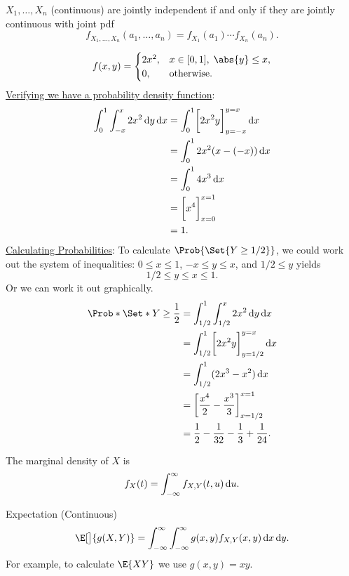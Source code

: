 \begin{Theorem}{}{}
    $ X_1,\ldots,X_n $ (continuous) are jointly independent
    if and only if they are jointly continuous with joint pdf
    \[ f_{X_1,\ldots,X_n}(a_1,\ldots,a_n)=f_{X_1}(a_1)\cdots f_{X_n}(a_n). \]
\end{Theorem}
\begin{Example}{}{}
    \[ f(x,y)=\begin{cases}
            2x^2, & x\in[0,1],\; \abs{y}\le x, \\
            0,    & \text{otherwise}.
        \end{cases} \]
    \underline{Verifying we have a probability density function}:
    \begin{align*}
        \int_{0}^{1}\int_{-x}^{x}2x^2\odif{y}\odif{x}
         & =\int_{0}^{1}\biggl[2x^2y\biggr]_{y=-x}^{y=x}\odif{x} \\
         & =\int_{0}^{1}2x^2(x-(-x))\odif{x}                     \\
         & =\int_{0}^{1}4x^3\odif{x}                             \\
         & =\biggl[x^4\biggr]_{x=0}^{x=1}                        \\
         & =1.
    \end{align*}
    \underline{Calculating Probabilities}:
    To calculate $ \Prob{\Set{Y\ge 1/2}} $,
    we could work out
    the system of inequalities: $ 0\le x\le 1 $, $ -x\le y\le x $, and $ 1/2\le y $ yields
    \[ 1/2\le y\le x\le 1. \]
    Or we can work it out graphically.
    \begin{align*}
        \Prob*{\Set*{Y\ge \frac{1}{2}}}
         & =\int_{1/2}^{1}\int_{1/2}^{x}2x^2\odif{y}\odif{x}        \\
         & =\int_{1/2}^{1}\biggl[2x^2y\biggr]_{y=1/2}^{y=x}\odif{x} \\
         & =\int_{1/2}^{1}(2x^3-x^2)\odif{x}                        \\
         & =\biggl[\frac{x^4}{2}-\frac{x^3}{3}\biggr]_{x=1/2}^{x=1} \\
         & =\frac{1}{2}-\frac{1}{32}-\frac{1}{3}+\frac{1}{24}.
    \end{align*}
\end{Example}
\begin{Definition}{}{}
    The marginal density of $ X $ is
    \[ f_X(t)=\int_{-\infty}^{\infty}f_{X,Y}(t,u)\odif{u}. \]
\end{Definition}
\begin{Definition}{Expectation (Continuous)}{}
    \[ \E[\big]{g(X,Y)}
        =\int_{-\infty}^{\infty}\int_{-\infty}^{\infty}g(x,y)f_{X,Y}(x,y)\odif{x}\odif{y}. \]
    \tcblower{}
    For example, to calculate $ \E{XY} $ we use $ g(x,y)=xy $.
\end{Definition}
